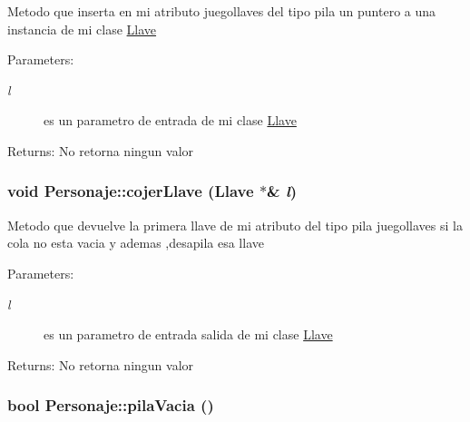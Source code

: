 Metodo que inserta en mi atributo juegollaves del tipo pila un puntero a una instancia de mi clase \hyperlink{classLlave}{Llave} \begin{Desc}
\item[Parameters:]
\begin{description}
\item[{\em l}]es un parametro de entrada de mi clase \hyperlink{classLlave}{Llave} \end{description}
\end{Desc}
\begin{Desc}
\item[Returns:]No retorna ningun valor \end{Desc}
\hypertarget{classPersonaje_8880afa570d1f919516e2810b2226b08}{
\subsubsection[cojerLlave]{\setlength{\rightskip}{0pt plus 5cm}void Personaje::cojerLlave ({\bf Llave} $\ast$\& {\em l})}}
\label{classPersonaje_8880afa570d1f919516e2810b2226b08}


Metodo que devuelve la primera llave de mi atributo del tipo pila juegollaves si la cola no esta vacia y ademas ,desapila esa llave \begin{Desc}
\item[Parameters:]
\begin{description}
\item[{\em l}]es un parametro de entrada salida de mi clase \hyperlink{classLlave}{Llave} \end{description}
\end{Desc}
\begin{Desc}
\item[Returns:]No retorna ningun valor \end{Desc}
\hypertarget{classPersonaje_27166f7a52fcfb3570e0dc20f37a2402}{
\subsubsection[pilaVacia]{\setlength{\rightskip}{0pt plus 5cm}bool Personaje::pilaVacia ()}}
\label{classPersonaje_27166f7a52fcfb3570e0dc20f37a2402}


